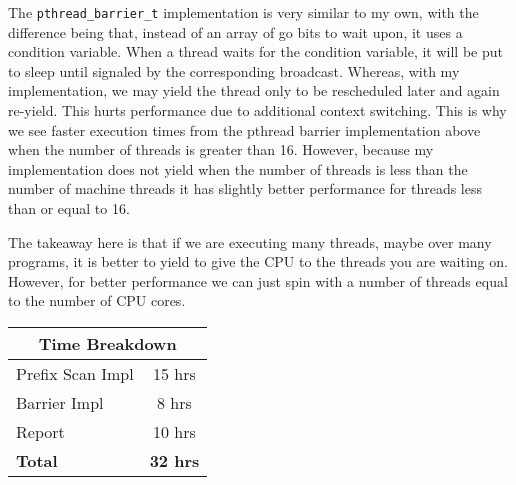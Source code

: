 \documentclass{article}
\begin{document}
\begin{center}
  
\end{center}

The \texttt{\small pthread\_barrier\_t} implementation is very similar to my
own, with the difference being that, instead of an array of go bits to wait
upon, it uses a condition variable.
When a thread waits for the condition variable, it will be put to sleep until
signaled by the corresponding broadcast.
Whereas, with my implementation, we may yield the thread only to be rescheduled
later and again re-yield.
This hurts performance due to additional context switching.
This is why we see faster execution times from the pthread barrier
implementation above when the number of threads is greater than 16.
However, because my implementation does not yield when the number of threads is
less than the number of machine threads it has slightly better performance for
threads less than or equal to 16.

The takeaway here is that if we are executing many threads, maybe over many
programs, it is better to yield to give the CPU to the threads you are waiting
on.
However, for better performance we can just spin with a number of threads equal
to the number of CPU cores.

\begin{center}
  
\end{center}

\begin{center}
  
\end{center}

\begin{center}
  \begin{tabular}{|l|c|}
    \hline
    \multicolumn{2}{|c|}{\bf Time Breakdown} \\ \hline
    Prefix Scan Impl & 15 hrs \\ \hline
    Barrier Impl & 8 hrs      \\ \hline
    Report & 10 hrs           \\ \hline
    \bf{Total} & \bf{32 hrs}  \\ \hline
  \end{tabular}
\end{center}
\end{document}
